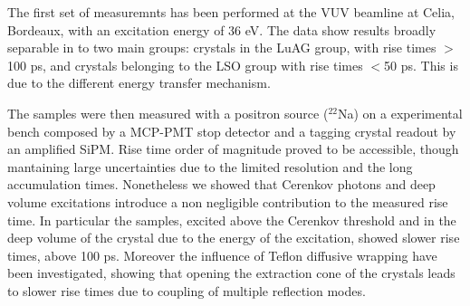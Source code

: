 The first set of measuremnts has been performed at the VUV beamline at Celia, Bordeaux, with an excitation energy of 36 eV. 
The data show results broadly separable in to two main groups: crystals in the LuAG group, with rise times $>$100 ps, and crystals belonging to the LSO group with rise times $<$50 ps. This is due to the different energy transfer mechanism.

The samples were then measured with a positron source ($^{22}$Na) on a experimental bench composed by a MCP-PMT stop detector and a tagging crystal readout by an amplified SiPM.
Rise time order of magnitude proved to be accessible, though mantaining large uncertainties due to the limited resolution and the long accumulation times.
Nonetheless we showed that Cerenkov photons and deep volume excitations introduce a non negligible contribution to the measured rise time. In particular the samples, excited above the Cerenkov threshold and in the deep volume of the crystal due to the energy of the excitation, showed slower rise times, above 100 ps.
Moreover the influence of Teflon diffusive wrapping have been investigated, showing that opening the extraction cone of the crystals leads to slower rise times due to coupling of multiple reflection modes.

